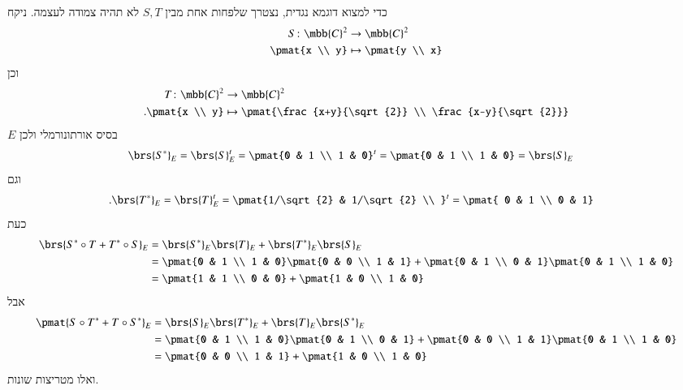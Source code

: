 \documentclass[a4paper,10pt,oneside,openany]{article}
\begin{document}
\begin{solution}
\begin{enumerate}
כדי למצוא דוגמא נגדית, נצטרך שלפחות אחת מבין
$S,T$
לא תהיה צמודה לעצמה.
ניקח
\begin{align*}
S \colon \mbb{C}^2 &\to \mbb{C}^2 \\
\pmat{x \\ y} &\mapsto \pmat{y \\ x}
\end{align*}
וכן
\begin{align*}
T \colon \mbb{C}^2 &\to \mbb{C}^2 \\
\text{.} \pmat{x \\ y} &\mapsto \pmat{\frac{x+y}{\sqrt{2}} \\ \frac{x-y}{\sqrt{2}}}
\end{align*}
$E$
בסיס אורתונורמלי ולכן
\begin{align*}
\brs{S^*}_E &= \brs{S}_E^t = \pmat{0 & 1 \\ 1 & 0}^t = \pmat{0 & 1 \\ 1 & 0} = \brs{S}_E
\end{align*}
וגם
\begin{align*}
\text{.} \brs{T^*}_E &= \brs{T}_E^t = \pmat{1/\sqrt{2} & 1/\sqrt{2} \\ }^t = \pmat{ 0 & 1 \\ 0 & 1}
\end{align*}
כעת
\begin{align*}
\brs{S^* \circ T + T^* \circ S}_E &=
\brs{S^*}_E \brs{T}_E + \brs{T^*}_E \brs{S}_E
\\&=
\pmat{0 & 1 \\ 1 & 0} \pmat{0 & 0 \\ 1 & 1} + \pmat{0 & 1 \\ 0 & 1} \pmat{0 & 1 \\ 1 & 0}
\\&=
\pmat{1 & 1 \\ 0 & 0} + \pmat{1 & 0 \\ 1 & 0}
\end{align*}
אבל
\begin{align*}
\pmat{S \circ T^* + T \circ S^*}_E &= \brs{S}_E \brs{T^*}_E + \brs{T}_E \brs{S^*}_E
\\&= \pmat{0 & 1 \\ 1 & 0} \pmat{0 & 1 \\ 0 & 1} + \pmat{0 & 0 \\ 1 & 1} \pmat{0 & 1 \\ 1 & 0}
\\&= \pmat{0 & 0 \\ 1 & 1} + \pmat{1 & 0 \\ 1 & 0}
\end{align*}
ואלו מטריצות שונות.


\end{enumerate}
\end{solution}
\end{document}
